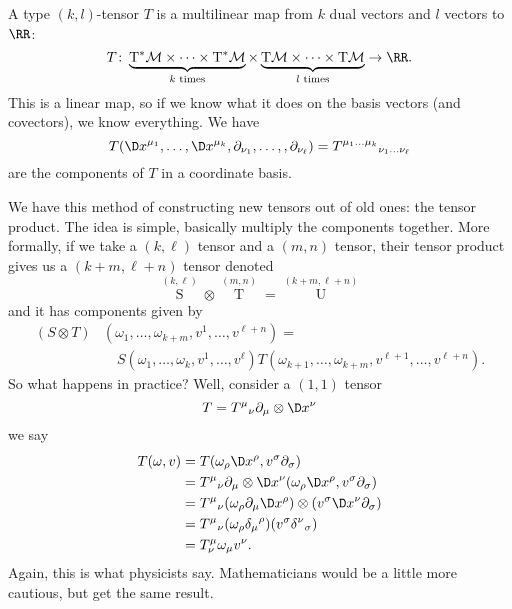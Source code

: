A type $(k,l)$-tensor $T$ is a multilinear map from $k$ dual
vectors and $l$ vectors to $\RR$:
\begin{equation}
T\colon\underbrace{\mathrm{T}^{*}\mathcal{M}
\times\dots\times\mathrm{T}^{*}\mathcal{M}}_{\text{$k$ times}}\times
\underbrace{\mathrm{T}\mathcal{M}
\times\dots\times\mathrm{T}\mathcal{M}}_{\text{$l$ times}}
\to\RR.
\end{equation}
This is a linear map, so if we know what it does on the basis
vectors (and covectors), we know everything. We have
\begin{equation}
T(\D x^{\mu_{1}},\dots,\D x^{\mu_{k}},\partial_{\nu_{1}},\dots,,\partial_{\nu_{\ell}})={T^{\mu_{1}\dots\mu_{k}}}_{\nu_{1}\dots\nu_{\ell}}
\end{equation}
are the components of $T$ in a coordinate basis.

We have this method of constructing new tensors out of old ones:
the tensor product. The idea is simple, basically multiply the
components together. More formally, if we take a $(k,\ell)$
tensor and a $(m,n)$ tensor, their tensor product gives us 
a $(k+m,\ell+n)$ tensor denoted
\begin{equation}
\mathop{S}\limits^{(k,\ell)}\otimes
\mathop{T}\limits^{(m,n)}=\mathop{U}\limits^{(k+m,\ell+n)}
\end{equation}
and it has components given by
\begin{equation}
\begin{split}
(S\otimes T)&(\omega_{1},\dots,\omega_{k+m},v^{1},\dots,v^{\ell+n})=\\
&\quad S(\omega_{1},\dots,\omega_{k},v^{1},\dots,v^{\ell})T(\omega_{k+1},\dots,\omega_{k+m},v^{\ell+1},\dots,v^{\ell+n}).
\end{split}
\end{equation}
So what happens in practice? Well, consider a $(1,1)$ tensor 
\begin{equation}
T={T^{\mu}}_{\nu}\partial_{\mu}\otimes\D x^{\nu}
\end{equation}
we say
\begin{subequations}
\begin{align}
T(\omega,v)
&= T(\omega_{\rho}\D x^{\rho},v^{\sigma}\partial_{\sigma})\\
&={T^{\mu}}_{\nu}\partial_{\mu}\otimes\D x^{\nu}(\omega_{\rho}\D x^{\rho},v^{\sigma}\partial_{\sigma})\\
&={T^{\mu}}_{\nu}(\omega_{\rho}\partial_{\mu}\D x^{\rho})\otimes(v^{\sigma}\D x^{\nu}\partial_{\sigma})\\
&={T^{\mu}}_{\nu}(\omega_{\rho}{\delta_{\mu}}^{\rho})(v^{\sigma}{\delta^{\nu}}_{\sigma})\\
&=T^{\mu}_{\nu}\omega_{\mu}v^{\nu}.
\end{align}
\end{subequations}
Again, this is what physicists say. Mathematicians would be a
little more cautious, but get the same result.

